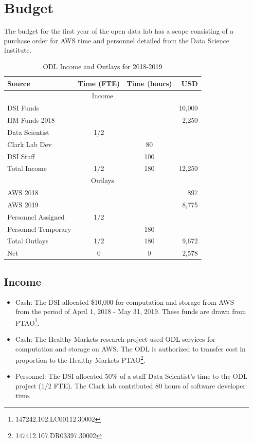 \section{Budget} %
The budget for the first year of the open data lab has a scope consisting of a purchase order for AWS time and personnel detailed from the Data Science Institute.

\begin{table}[htbp]
\begin{center}
\begin{tabular}{lccr}
\hline
\hline
Source & Time (FTE) & Time (hours) & USD \\
\hline
\multicolumn{4}{c}{Income} \\
\hline
DSI Funds & && 10,000 \\
HM Funds 2018 & && 2,250 \\
Data Scientist & 1/2 & & \\
Clark Lab Dev & & 80 & \\
DSI Staff & & 100 & \\
\hline
Total Income & 1/2  & 180 & 12,250 \\
\hline
\hline
\multicolumn{4}{c}{Outlays} \\
\hline
AWS 2018 & && 897 \\
AWS 2019 & && 8,775 \\
Personnel Assigned & 1/2  &  & \\
Personnel Temporary & & 180 & \\
\hline
Total Outlays & 1/2  & 180 & 9,672 \\
\hline
\hline
Net & 0 & 0 & 2,578\\
\hline
\hline
\end{tabular}
\caption{ODL Income and Outlays for 2018-2019}
\end{center}
\end{table}

\subsection{Income}
\begin{itemize}
\item Cash: The DSI allocated \$10,000 for computation and storage from AWS from the period of April 1, 2018 - May 31, 2019. These funds are drawn from PTAO\footnote{147242.102.LC00112.30002}.
\item Cash: The Healthy Markets research project used ODL services for computation and storage on AWS. The ODL is authorized to transfer cost in proportion to the Healthy Markets PTAO\footnote{147412.107.DR03397.30002}.
\item Personnel: The DSI allocated 50\% of a staff Data Scientist's time to the ODL project (1/2 FTE). The Clark lab contributed 80 hours of software developer time.
\end{itemize}
